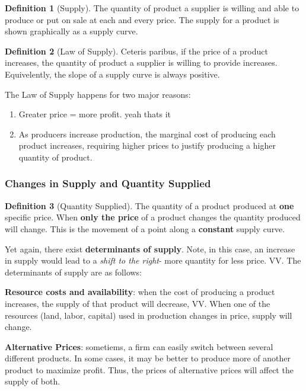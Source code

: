 \documentclass[12pt, a4paper]{article}
\theoremstyle{definition}
\newtheorem{definition}{Definition}
\begin{document}
\begin{definition}[Supply]
    The quantity of product a supplier is willing and able to produce or put on sale at each and every price.
    The supply for a product is shown graphically as a supply curve.
\end{definition}

\begin{definition}[Law of Supply]
    Ceteris paribus, if the price of a product increases, the quantity of product a supplier is willing to provide increases.
    Equivelently, the slope of a supply curve is always positive.
\end{definition}

The Law of Supply happens for two major reasons:
\begin{enumerate}
    \item Greater price = more profit. yeah thats it
    \item As producers increase production, the marginal cost of producing each product increases, requiring higher prices to justify producing a higher quantity of product.
\end{enumerate}

\subsubsection{Changes in Supply and Quantity Supplied}
\begin{definition}[Quantity Supplied]
    The quantity of a product produced at \textbf{one} specific price.
    When \textbf{only the price} of a product changes the quantity produced will change.
    This is the movement of a point along a \textbf{constant} supply curve.
\end{definition}

Yet again, there exist \textbf{determinants of supply}.
Note, in this case, an increase in supply would lead to a \textit{shift to the right}- more quantity for less price. VV.
The determinants of supply are as follows:

\textbf{Resource costs and availability}: when the cost of producing a product increases, the supply of that product will decrease, VV.
When one of the resources (land, labor, capital) used in production changes in price, supply will change.

\textbf{Alternative Prices}: sometiems, a firm can easily switch between several different products.
In some cases, it may be better to produce more of another product to maximize profit.
Thus, the prices of alternative prices will affect the supply of both.
\end{document}
